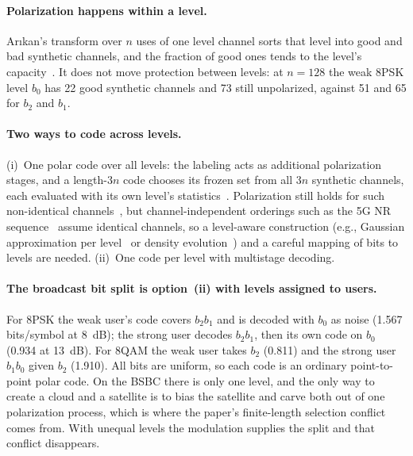 \documentclass[11pt]{article}
\begin{document}
\paragraph{Polarization happens within a level.} Arıkan's transform over $n$ uses of one level channel sorts that level into good and bad synthetic channels, and the fraction of good ones tends to the level's capacity~\cite{ArikanPolar}. It does not move protection between levels: at $n=128$ the weak 8PSK level $b_0$ has 22 good synthetic channels and 73 still unpolarized, against 51 and 65 for $b_2$ and $b_1$.

\paragraph{Two ways to code across levels.} (i)~One polar code over all levels: the labeling acts as additional polarization stages, and a length-$3n$ code chooses its frozen set from all $3n$ synthetic channels, each evaluated with its own level's statistics~\cite{seidl2013pcm,mahdavifar2016bicm}. Polarization still holds for such non-identical channels~\cite{alsan2016nonstationary}, but channel-independent orderings such as the 5G NR sequence~\cite{3gpp38212,bioglio2021} assume identical channels, so a level-aware construction (e.g., Gaussian approximation per level~\cite{trifonov2012ga} or density evolution~\cite{talvardy2013}) and a careful mapping of bits to levels are needed. (ii)~One code per level with multistage decoding.

\paragraph{The broadcast bit split is option~(ii) with levels assigned to users.} For 8PSK the weak user's code covers $b_2b_1$ and is decoded with $b_0$ as noise (1.567 bits/symbol at 8~dB); the strong user decodes $b_2b_1$, then its own code on $b_0$ (0.934 at 13~dB). For 8QAM the weak user takes $b_2$ (0.811) and the strong user $b_1b_0$ given $b_2$ (1.910). All bits are uniform, so each code is an ordinary point-to-point polar code. On the BSBC there is only one level, and the only way to create a cloud and a satellite is to bias the satellite and carve both out of one polarization process, which is where the paper's finite-length selection conflict comes from. With unequal levels the modulation supplies the split and that conflict disappears.

\FloatBarrier
\end{document}
